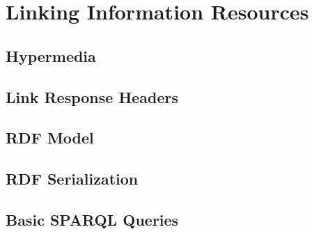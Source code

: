 \chapter{Linking Information Resources}

\section{Hypermedia}

\section{Link Response Headers}

\section{RDF Model}

\section{RDF Serialization}

\section{Basic SPARQL Queries}
